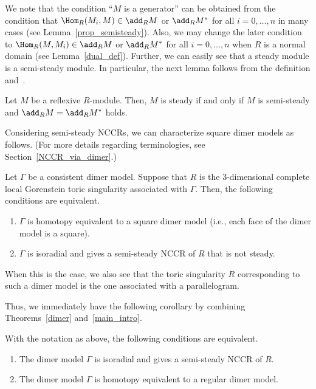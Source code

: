We note that the condition ``$M$ is a generator'' can be obtained from the condition that $\Hom_R(M_i,M)\in\add_RM$ or $\add_RM^*$ for all $i=0,\dots,n$ in many cases (see Lemma~\ref{prop_semisteady}). Also, we may change the later condition to $\Hom_R(M,M_i)\in\add_RM$ or $\add_RM^*$ for all $i=0,\dots,n$ when $R$ is a normal domain (see Lemma~\ref{dual_def}). Further, we can easily see that a steady module is a semi-steady module. In particular, the next lemma follows from the definition and~\cite[Lemma~2.5$\MK$(b)]{IN}.

\begin{lemm}\label{semisteady_iff_steady}
Let $M$ be a reflexive $R$-module. Then, $M$ is steady if and only if $M$ is semi-steady and $\add_RM=\add_RM^*$ holds.
\end{lemm}

Considering semi-steady NCCRs, we can characterize square dimer models as follows. (For more details regarding terminologies, see Section~\ref{NCCR_via_dimer}.)

\begin{theo}\label{main_intro}
Let $\Gamma$ be a consistent dimer model. Suppose that $R$ is the $3$-dimensional complete local Gorenstein toric singularity associated with $\Gamma$. Then, the following conditions are equivalent.
\begin{enumerate}%
\item $\Gamma$ is homotopy equivalent to a square dimer model (i.e., each face of the dimer model is a square).
\item $\Gamma$ is isoradial and gives a semi-steady NCCR of $R$ that is not steady.
\end{enumerate}
When this is the case, we also see that the toric singularity $R$ corresponding to such a dimer model is the one associated with a parallelogram.
\end{theo}

Thus, we immediately have the following corollary by combining Theorems~\ref{dimer} and~\ref{main_intro}.

\begin{coro}\label{main_cor_intro}
With the notation as above, the following conditions are equivalent.
\begin{enumerate}%
\item The dimer model $\Gamma$ is isoradial and gives a semi-steady NCCR of $R$.
\item The dimer model $\Gamma$ is homotopy equivalent to a regular dimer model.
\end{enumerate}
\end{coro}

